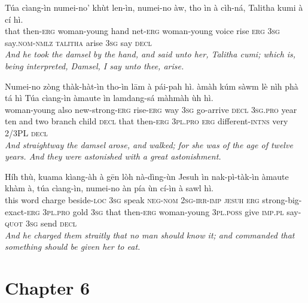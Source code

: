 \documentclass[11pt,a4paper]{article}
\begin{document}
\begin{exe}
\gll Túa cìang-ìn numei-no' khùt len-ìn, numei-no àw, tho ìn à cìh-ná,  Talitha kumi  à cí hì. \\
     that then-\textsc{erg} woman-young hand net-\textsc{erg} woman-young voice rise \textsc{erg} \textsc{3sg} say.\textsc{nom}-\textsc{nmlz}  \textsc{talitha} arise  \textsc{3sg} say \textsc{decl} \\
\glt \textcolor{kjvcolor}{\textit{And he took the damsel by the hand, and said unto her, Talitha cumi; which is, being interpreted, Damsel, I say unto thee, arise.}}

\gll Numei-no zòng thàk-hàt-ìn tho-ìn lām à pái-pah hì. àmàh kúm sàwm lè nìh phà tá hì Túa cìang-ìn àmaute ìn lamdang-sá màhmàh ùh hì. \\
     woman-young also new-strong-\textsc{erg} rise-\textsc{erg} way \textsc{3sg} go-arrive \textsc{decl} \textsc{3sg}.\textsc{pro} year ten and two branch child \textsc{decl} that then-\textsc{erg} \textsc{3pl}.\textsc{pro} \textsc{erg} different-\textsc{intns} very 2/3PL \textsc{decl} \\
\glt \textcolor{kjvcolor}{\textit{And straightway the damsel arose, and walked; for she was of the age of twelve years. And they were astonished with a great astonishment.}}

\gll Híh thù, kuama kìang-àh à gēn lòh nà-dìng-ùn Jesuh ìn nak-pì-tàk-ìn àmaute khàm à, túa cìang-ìn, numei-no àn pía ùn cí-ìn à sawl hì. \\
     this word charge beside-\textsc{loc} \textsc{3sg} speak \textsc{neg}-\textsc{nom} \textsc{2sg}-\textsc{irr}-\textsc{imp} \textsc{jesuh} \textsc{erg} strong-big-exact-\textsc{erg} \textsc{3pl}.\textsc{pro} gold \textsc{3sg} that then-\textsc{erg} woman-young \textsc{3pl}.\textsc{poss} give \textsc{imp}.\textsc{pl} say-\textsc{quot} \textsc{3sg} send \textsc{decl} \\
\glt \textcolor{kjvcolor}{\textit{And he charged them straitly that no man should know it; and commanded that something should be given her to eat.}}

\end{exe}
\newpage

\section*{Chapter 6}
\end{document}
